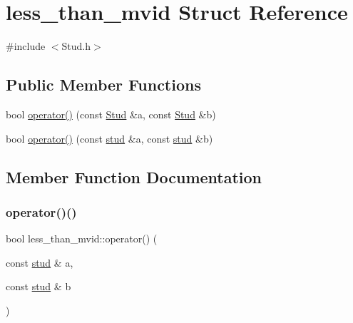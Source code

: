 \hypertarget{structless__than__mvid}{}\section{less\+\_\+than\+\_\+mvid Struct Reference}
\label{structless__than__mvid}


{\ttfamily \#include $<$Stud.\+h$>$}

\subsection*{Public Member Functions}
\begin{DoxyCompactItemize}
\item 
bool \mbox{\hyperlink{structless__than__mvid_a87c29141d7da17106b448f9000d3a342}{operator()}} (const \mbox{\hyperlink{class_stud}{Stud}} \&a, const \mbox{\hyperlink{class_stud}{Stud}} \&b)
\item 
bool \mbox{\hyperlink{structless__than__mvid_a211864db8230968cec95f5f85b8ff07c}{operator()}} (const \mbox{\hyperlink{structstud}{stud}} \&a, const \mbox{\hyperlink{structstud}{stud}} \&b)
\end{DoxyCompactItemize}


\subsection{Member Function Documentation}
\mbox{\label{structless__than__mvid_a211864db8230968cec95f5f85b8ff07c}} 
\subsubsection{\texorpdfstring{operator()()}{operator()()}\hspace{0.1cm}{\footnotesize\ttfamily [1/2]}}
{\footnotesize\ttfamily bool less\+\_\+than\+\_\+mvid\+::operator() (\begin{DoxyParamCaption}\item[{const \mbox{\hyperlink{structstud}{stud}} \&}]{a,  }\item[{const \mbox{\hyperlink{structstud}{stud}} \&}]{b }\end{DoxyParamCaption})\hspace{0.3cm}{\ttfamily [inline]}}

\mbox{\label{structless__than__mvid_a87c29141d7da17106b448f9000d3a342}} 
